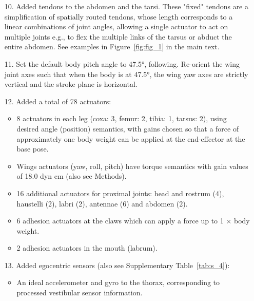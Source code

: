 \documentclass[sn-mathphys-num]{sn-jnl}%
\theoremstyle{thmstyleone}	%
\theoremstyle{thmstyletwo}	%
\theoremstyle{thmstylethree}	%
\begin{document}
\begin{appendices}
\begin{itemize}
	
	\item[10.] 
	Added tendons to the abdomen and the tarsi. 
	These "fixed" tendons are a simplification of spatially routed tendons, whose length corresponds to a linear combinations of joint angles, allowing a single actuator to act on multiple joints e.g., to flex the multiple links of the tarsus or abduct the entire abdomen. 
	See examples in Figure~\ref{fig:fig_1} in the main text.
	
	\item[11.] 
	Set the default body pitch angle to 47.5°, following\cite{muijres2014flies}. 
	Re-orient the wing joint axes such that when the body is at 47.5°, the wing yaw axes are strictly vertical and the stroke plane is horizontal.
	
	\item[12.] 
	Added a total of 78 actuators:
		\begin{itemize}
			\item 8 actuators in each leg (coxa: 3, femur: 2, tibia: 1, tarsus: 2), using desired angle (position) semantics, with gains chosen so that a force of approximately one body weight can be applied at the end-effector at the base pose.
			
			\item Wings actuators (yaw, roll, pitch) have torque semantics with gain values of 18.0 dyn cm (also see Methods).
			
			\item 
			16 additional actuators for proximal joints: head and rostrum (4), haustelli (2), labri (2), antennae (6) and abdomen (2).
			
			\item 
			6 adhesion actuators at the claws which can apply a force up to 1 $ \times $ body weight.
			
			\item 
			2 adhesion actuators in the mouth (labrum).
		\end{itemize}
	
	\item[13.] 
	Added egocentric sensors (also see Supplementary Table~\ref{tab:s_4}):
		\begin{itemize}
			\item An ideal accelerometer and gyro to the thorax, corresponding to processed vestibular sensor information.
			

\end{itemize}
\end{itemize}
\end{appendices}
\end{document}
